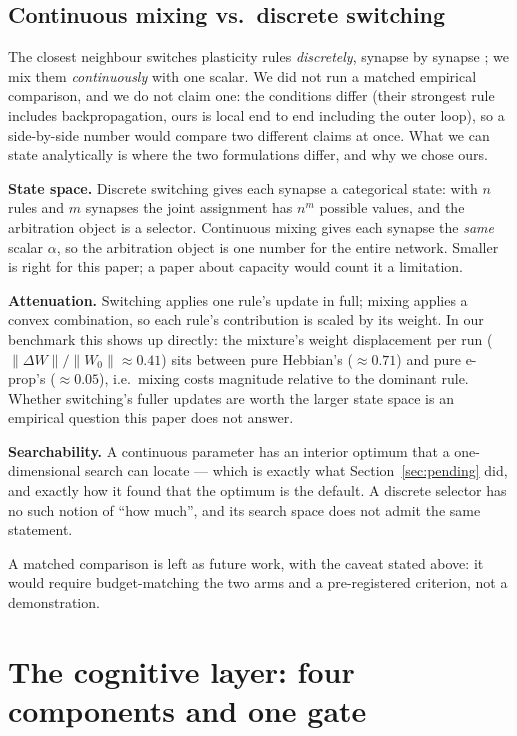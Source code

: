 \documentclass[11pt]{article}
\begin{document}
\subsection{Continuous mixing vs.\ discrete switching}

The closest neighbour switches plasticity rules \emph{discretely}, synapse by synapse
\citep{turcu2025switching}; we mix them \emph{continuously} with one scalar. We did not run a
matched empirical comparison, and we do not claim one: the conditions differ (their strongest
rule includes backpropagation, ours is local end to end including the outer loop), so a side-by-side
number would compare two different claims at once. What we can state analytically is where the two
formulations differ, and why we chose ours.

\textbf{State space.} Discrete switching gives each synapse a categorical state: with $n$ rules
and $m$ synapses the joint assignment has $n^{m}$ possible values, and the arbitration object is a
selector. Continuous mixing
gives each synapse the \emph{same} scalar $\alpha$, so the arbitration object is one number for the
entire network. Smaller is right for this paper; a paper about capacity would count it a
limitation.

\textbf{Attenuation.} Switching applies one rule's update in full; mixing applies a convex
combination, so each rule's contribution is scaled by its weight. In our benchmark this shows up
directly: the mixture's weight displacement per run ($\|\Delta W\|/\|W_0\| \approx 0.41$) sits
between pure Hebbian's ($\approx 0.71$) and pure e-prop's ($\approx 0.05$), i.e.\ mixing costs
magnitude relative to the dominant rule. Whether switching's fuller updates are worth the larger
state space is an empirical question this paper does not answer.

\textbf{Searchability.} A continuous parameter has an interior optimum that a one-dimensional
search can locate --- which is exactly what Section~\ref{sec:pending} did, and exactly how it
found that the optimum is the default. A discrete selector has no such notion of
``how much'', and its search space does not admit the same statement.

A matched comparison is left as future work, with the caveat stated above: it would require
budget-matching the two arms and a pre-registered criterion, not a demonstration.

\section{The cognitive layer: four components and one gate}
\label{sec:cognitive-layer}
\end{document}
